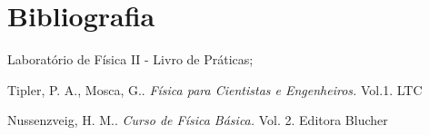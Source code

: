 \documentclass[a4paper, 12pt]{article}
\begin{document}
\section{Bibliografia}
\begin{thebibliography}{9}

Laboratório de Física II - Livro de Práticas;

Tipler, P. A., Mosca, G.. \textit{Física para Cientistas e Engenheiros.} Vol.1. LTC

Nussenzveig, H. M.. \textit{Curso de Física Básica. } Vol. 2. Editora Blucher

\end{thebibliography}
\end{document}

